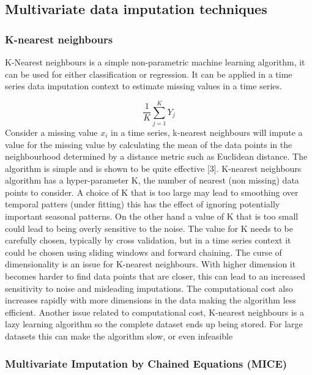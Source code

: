 \documentclass[
]{report}
\begin{document}
\subsection{Multivariate data imputation
techniques}\label{multivariate-data-imputation-techniques}

\subsubsection{K-nearest neighbours}\label{k-nearest-neighbours}

K-Nearest neighbours is a simple non-parametric machine learning
algorithm, it can be used for either classification or regression. It
can be applied in a time series data imputation context to estimate
missing values in a time series.

\[\frac{1}{K}\sum_{j=1}^K Y_j\] Consider a missing value \(x_i\) in a
time series, k-nearest neighbours will impute a value for the missing
value by calculating the mean of the data points in the neighbourhood
determined by a distance metric such as Euclidean distance. The
algorithm is simple and is shown to be quite effective {[}3{]}.
K-nearest neighbours algorithm has a hyper-parameter K, the number of
nearest (non missing) data points to consider. A choice of K that is too
large may lead to smoothing over temporal patters (under fitting) this
has the effect of ignoring potentially important seasonal patterns. On
the other hand a value of K that is too small could lead to being overly
sensitive to the noise. The value for K needs to be carefully chosen,
typically by cross validation, but in a time series context it could be
chosen using sliding windows and forward chaining. The curse of
dimensionality is an issue for K-nearest neighbours. With higher
dimension it becomes harder to find data points that are closer, this
can lead to an increased sensitivity to noise and misleading
imputations. The computational cost also increases rapidly with more
dimensions in the data making the algorithm less efficient. Another
issue related to computational cost, K-nearest neighbours is a lazy
learning algorithm so the complete dataset ends up being stored. For
large datasets this can make the algorithm slow, or even infeasible


\subsubsection{Multivariate Imputation by Chained Equations
(MICE)}\label{multivariate-imputation-by-chained-equations-mice}
\end{document}
